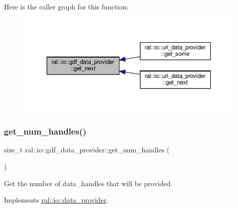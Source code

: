 Here is the caller graph for this function\+:\nopagebreak
\begin{figure}[H]
\begin{center}
\leavevmode
\includegraphics[width=350pt]{classral_1_1io_1_1gdf__data__provider_a6770bc3c6f51365ecd3c7cc16babb7ff_icgraph}
\end{center}
\end{figure}
\mbox{\label{classral_1_1io_1_1gdf__data__provider_a681eb5bce251e2dc1895a2941d41931f}} 
\subsubsection{\texorpdfstring{get\+\_\+num\+\_\+handles()}{get\_num\_handles()}}
{\footnotesize\ttfamily size\+\_\+t ral\+::io\+::gdf\+\_\+data\+\_\+provider\+::get\+\_\+num\+\_\+handles (\begin{DoxyParamCaption}{ }\end{DoxyParamCaption})\hspace{0.3cm}{\ttfamily [virtual]}}

Get the number of data\+\_\+handles that will be provided. 

Implements \hyperlink{classral_1_1io_1_1data__provider_a00ff9cc629a869d7b7e6a67c90056749}{ral\+::io\+::data\+\_\+provider}.

\mbox{\label{classral_1_1io_1_1gdf__data__provider_a26fdba323411bb0b8270f735e6e5ee77}} 
